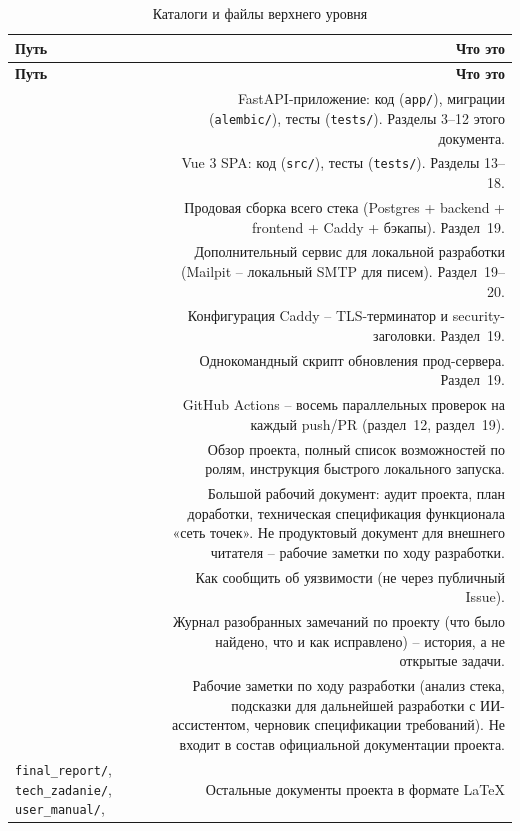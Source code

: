 \begin{xltabular}{\textwidth}{M D}
\caption{Каталоги и файлы верхнего уровня} \\
\hline
\textbf{Путь} & \textbf{Что это} \\
\hline
\endfirsthead
\hline
\textbf{Путь} & \textbf{Что это} \\
\hline
\endhead
\hline
\endfoot
{} & FastAPI-приложение: код (\texttt{app/}), миграции
  (\texttt{alembic/}), тесты (\texttt{tests/}). Разделы 3--12 этого
  документа. \\
 & Vue 3 SPA: код (\texttt{src/}), тесты
  (\texttt{tests/}). Разделы 13--18. \\
 & Продовая сборка всего стека (Postgres +
  backend + frontend + Caddy + бэкапы). Раздел~19. \\
 & Дополнительный сервис для локальной
  разработки (Mailpit -- локальный SMTP для писем). Раздел~19--20. \\
 & Конфигурация Caddy -- TLS-терминатор и
  security-заголовки. Раздел~19. \\
 & Однокомандный скрипт обновления прод-сервера.
  Раздел~19. \\
 & GitHub Actions -- восемь параллельных
  проверок на каждый push/PR (раздел~12, раздел~19). \\
 & Обзор проекта, полный список возможностей по ролям,
  инструкция быстрого локального запуска. \\
 & Большой рабочий документ: аудит проекта, план
  доработки, техническая спецификация функционала «сеть точек». Не
  продуктовый документ для внешнего читателя -- рабочие заметки по ходу
  разработки. \\
 & Как сообщить об уязвимости (не через публичный
  Issue). \\
 & Журнал разобранных замечаний по проекту
  (что было найдено, что и как исправлено) -- история, а не открытые
  задачи. \\
 & Рабочие заметки по ходу разработки (анализ стека,
  подсказки для дальнейшей разработки с ИИ-ассистентом, черновик
  спецификации требований). Не входит в состав официальной документации
  проекта. \\
\texttt{final_report/}, \texttt{tech_zadanie/}, \texttt{user_manual/},
   & Остальные документы проекта в формате LaTeX

\end{xltabular}
